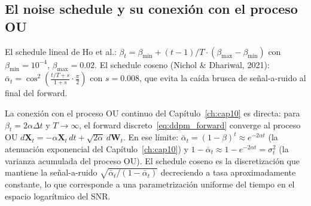 \begin{algorithm}[H]
\caption{DDPM: entrenamiento y muestreo}
\label{alg:ddpm}
\end{algorithm}

\subsection{El noise schedule y su conexión con el proceso OU}
\label{subsec:ddpm_schedule}

El schedule lineal de Ho et al.: $\beta_t = \beta_{\min} + (t-1)/T\cdot
(\beta_{\max}-\beta_{\min})$ con $\beta_{\min}=10^{-4}$, $\beta_{\max}=0.02$.
El schedule coseno (Nichol \& Dhariwal, 2021):
$\bar{\alpha}_t = \cos^2\!\left(\frac{t/T + s}{1+s}\cdot\frac{\pi}{2}\right)$
con $s = 0.008$, que evita la caída brusca de señal-a-ruido al final del
forward.

La conexión con el proceso OU continuo del Capítulo~\ref{ch:cap10} es directa: para
$\beta_t = 2\alpha\Delta t$ y $T\to\infty$, el forward discreto~\eqref{eq:ddpm_forward}
converge al proceso OU $d\bm{X}_t = -\alpha\bm{X}_t\,dt + \sqrt{2\alpha}\,
d\bm{W}_t$. En ese límite: $\bar{\alpha}_t = (1-\beta)^t \approx e^{-2\alpha t}$
(la atenuación exponencial del Capítulo~\ref{ch:cap10}) y $1-\bar{\alpha}_t \approx
1-e^{-2\alpha t} = \sigma_t^2$ (la varianza acumulada del proceso OU).
El schedule coseno es la discretización que mantiene la señal-a-ruido
$\sqrt{\bar{\alpha}_t/(1-\bar{\alpha}_t)}$ decreciendo a tasa aproximadamente
constante, lo que corresponde a una parametrización uniforme del tiempo en el
espacio logarítmico del SNR.

